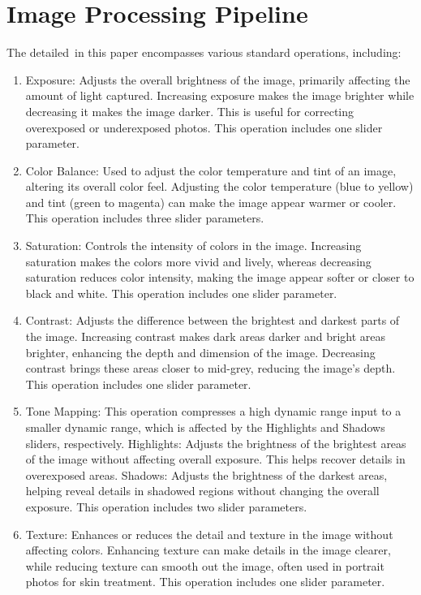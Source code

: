  

\section{Image Processing Pipeline}
The detailed~\pipeline in this paper encompasses various standard operations, including:
\begin{enumerate}[label=(\arabic*)]
    \item Exposure: Adjusts the overall brightness of the image, primarily affecting the amount of light captured. Increasing exposure makes the image brighter while decreasing it makes the image darker. This is useful for correcting overexposed or underexposed photos. This operation includes one slider parameter.
    
    \item Color Balance: Used to adjust the color temperature and tint of an image, altering its overall color feel. Adjusting the color temperature (blue to yellow) and tint (green to magenta) can make the image appear warmer or cooler. This operation includes three slider parameters.
    
    \item Saturation: Controls the intensity of colors in the image. Increasing saturation makes the colors more vivid and lively, whereas decreasing saturation reduces color intensity, making the image appear softer or closer to black and white. This operation includes one slider parameter.

    \item Contrast: Adjusts the difference between the brightest and darkest parts of the image. Increasing contrast makes dark areas darker and bright areas brighter, enhancing the depth and dimension of the image. Decreasing contrast brings these areas closer to mid-grey, reducing the image’s depth. This operation includes one slider parameter.
    
    \item Tone Mapping: This operation compresses a high dynamic range input to a smaller dynamic range, which is affected by the Highlights and Shadows sliders, respectively. Highlights: Adjusts the brightness of the brightest areas of the image without affecting overall exposure. This helps recover details in overexposed areas. Shadows: Adjusts the brightness of the darkest areas, helping reveal details in shadowed regions without changing the overall exposure. This operation includes two slider parameters.
    
     \item Texture: Enhances or reduces the detail and texture in the image without affecting colors. Enhancing texture can make details in the image clearer, while reducing texture can smooth out the image, often used in portrait photos for skin treatment. This operation includes one slider parameter.
    
\end{enumerate}






